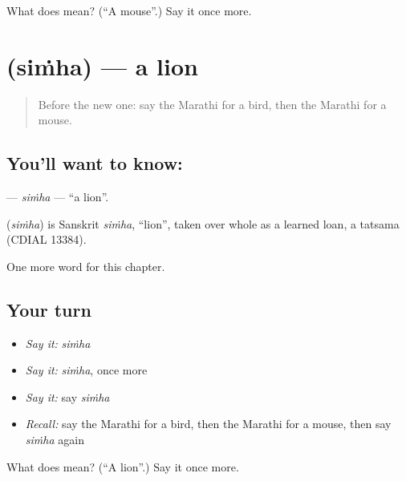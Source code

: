 \begin{tcolorbox}[breakable,colback=teal!4,colframe=teal!35!black,title={Before you move on}]
What does  mean? (\textquotedblleft{}A mouse\textquotedblright{}.) Say it once more.
\end{tcolorbox}
\section[\texorpdfstring{\mr{सिंह} (siṁha)}{सिंह (siṁha)}]{ (siṁha) — a lion}

\label{lesson:MR-C101-simha}



\begin{quote}
Before the new one: say the Marathi for a bird, then the Marathi for a mouse.
\end{quote}

\subsection*{You'll want to know: }
\textbf{} — \emph{siṁha} — \textquotedblleft{}a lion\textquotedblright{}.

\begin{cousinweb}
\textbf{} (\emph{siṁha}) is Sanskrit \emph{siṁha}, \textquotedblleft{}lion\textquotedblright{}, taken over whole as a learned loan, a tatsama (CDIAL 13384).
\end{cousinweb}

\begin{grammarlens}[title={What you've built}]
One more word for this chapter.
\end{grammarlens}

\subsection*{Your turn}
\begin{itemize}
\raggedright
  \item \emph{Say it:} \emph{siṁha}
  \item \emph{Say it:} \emph{siṁha}, once more
  \item \emph{Say it:} say \emph{siṁha}
  \item \emph{Recall:} say the Marathi for a bird, then the Marathi for a mouse, then say \emph{siṁha} again
\end{itemize}

\begin{tcolorbox}[breakable,colback=teal!4,colframe=teal!35!black,title={Before you move on}]
What does  mean? (\textquotedblleft{}A lion\textquotedblright{}.) Say it once more.
\end{tcolorbox}
